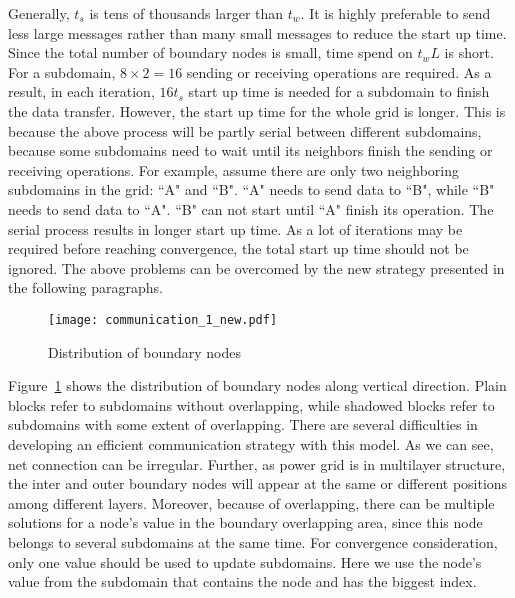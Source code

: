 \documentclass{sig-alternate}
\begin{document}
	Generally, $t_s$ is tens of thousands larger than $t_w$. It is highly preferable to send less 
	large messages rather than many small messages to reduce the start up time. Since the total number of boundary nodes is small, 
	time spend on $t_wL$ is short. For a subdomain, $8\times 2 = 
	16$ sending or receiving operations are required. As a result, in each iteration, $16t_s$ start up time is
	needed for a subdomain to finish the data transfer. However, the start up time for the whole grid is longer.
	This is because the above process will be partly serial between different subdomains, because some subdomains need to wait until
	its neighbors finish the sending or receiving operations. For example, 
	assume there are only two neighboring subdomains in the grid: ``A" and ``B". ``A" needs to send data to ``B", while ``B" needs
	to send data to ``A". ``B" can not start until ``A" finish its operation. The serial process results in 
	longer start up time. As a lot of iterations may be required before reaching convergence, the total 
	start up time should not be ignored. The above problems can be overcomed by the new strategy presented in the following paragraphs.

	\begin{figure}[htbp]
	  \centering
	  \texttt{[image: communication\_1\_new.pdf]}
	  \caption{Distribution of boundary nodes}
	  \label{comm}
	\end{figure}

	Figure~\ref{comm} shows the distribution of boundary nodes along vertical direction. Plain blocks refer to subdomains without 
	overlapping, while shadowed blocks refer to subdomains with some extent of overlapping. There are several difficulties in 
	developing an efficient communication strategy with this model. As we can see, net connection can be irregular. Further, 
	as power grid is in multilayer 
	structure, the inter and outer boundary nodes will appear at the same or different positions
	among different layers. Moreover, because of overlapping, there can be multiple solutions for a node's value in the boundary 
	overlapping area, since this node belongs to several subdomains at the same time. For convergence consideration, only one value 
	should be used to update subdomains. Here we use the node's value from the subdomain that contains the node and has the biggest 
	index.
\end{document}
